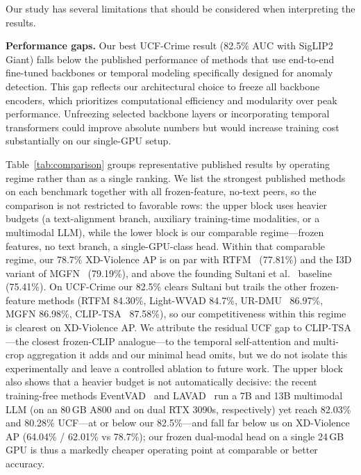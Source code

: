 \documentclass[sigconf]{acmart}
\begin{document}
Our study has several limitations that should be considered when interpreting the results.

\textbf{Performance gaps.} Our best UCF-Crime result (82.5\% AUC with SigLIP2 Giant) falls below the published performance of methods that use end-to-end fine-tuned backbones or temporal modeling specifically designed for anomaly detection. This gap reflects our architectural choice to freeze all backbone encoders, which prioritizes computational efficiency and modularity over peak performance. Unfreezing selected backbone layers or incorporating temporal transformers could improve absolute numbers but would increase training cost substantially on our single-GPU setup.

Table~\ref{tab:comparison} groups representative published results by operating regime rather than as a single ranking. We list the strongest published methods on each benchmark together with all frozen-feature, no-text peers, so the comparison is not restricted to favorable rows: the upper block uses heavier budgets (a text-alignment branch, auxiliary training-time modalities, or a multimodal LLM), while the lower block is our comparable regime---frozen features, no text branch, a single-GPU-class head. Within that comparable regime, our 78.7\% XD-Violence AP is on par with RTFM~\cite{tian2021rtfm} (77.81\%) and the I3D variant of MGFN~\cite{chen2023mgfn} (79.19\%), and above the founding Sultani et al.~\cite{sultani2018ucfcrime} baseline (75.41\%). On UCF-Crime our 82.5\% clears Sultani but trails the other frozen-feature methods (RTFM 84.30\%, Light-WVAD 84.7\%, UR-DMU~\cite{zhou2023urdmu} 86.97\%, MGFN 86.98\%, CLIP-TSA~\cite{joo2023cliptsa} 87.58\%), so our competitiveness within this regime is clearest on XD-Violence AP. We attribute the residual UCF gap to CLIP-TSA---the closest frozen-CLIP analogue---to the temporal self-attention and multi-crop aggregation it adds and our minimal head omits, but we do not isolate this experimentally and leave a controlled ablation to future work. The upper block also shows that a heavier budget is not automatically decisive: the recent training-free methods EventVAD~\cite{shao2025eventvad} and LAVAD~\cite{zanella2024lavad} run a 7B and 13B multimodal LLM (on an 80\,GB A800 and on dual RTX 3090s, respectively) yet reach 82.03\% and 80.28\% UCF---at or below our 82.5\%---and fall far below us on XD-Violence AP (64.04\% / 62.01\% vs 78.7\%); our frozen dual-modal head on a single 24\,GB GPU is thus a markedly cheaper operating point at comparable or better accuracy.
\end{document}
